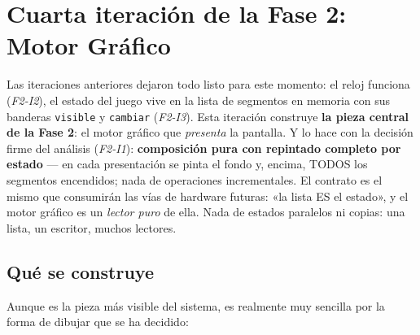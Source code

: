 \section{Cuarta iteración de la Fase 2: Motor Gráfico}
\label{sec:MotorGrafico}


Las iteraciones anteriores dejaron todo listo para este momento: el reloj funciona
(\emph{F2-I2}), el estado del juego vive en la lista de segmentos en memoria con sus
banderas \texttt{visible} y \texttt{cambiar} (\emph{F2-I3}). Esta iteración construye
\textbf{la pieza central de la Fase 2}: el motor gráfico que \emph{presenta} la pantalla.
Y lo hace con la decisión firme del análisis (\emph{F2-I1}): \textbf{composición pura con
	repintado completo por estado} --- en cada presentación se pinta el fondo y, encima, TODOS
los segmentos encendidos; nada de operaciones incrementales. El contrato es el mismo que
consumirán las vías de hardware futuras: «la lista ES el estado», y el motor gráfico es un
\emph{lector puro} de ella. Nada de estados paralelos ni copias: una lista, un escritor, muchos lectores.

\subsection{Qué se construye}
\label{subsec:QueSeConstruyeF2I4}

Aunque es la pieza más visible del sistema, es realmente muy sencilla por la forma de dibujar que se ha decidido:

